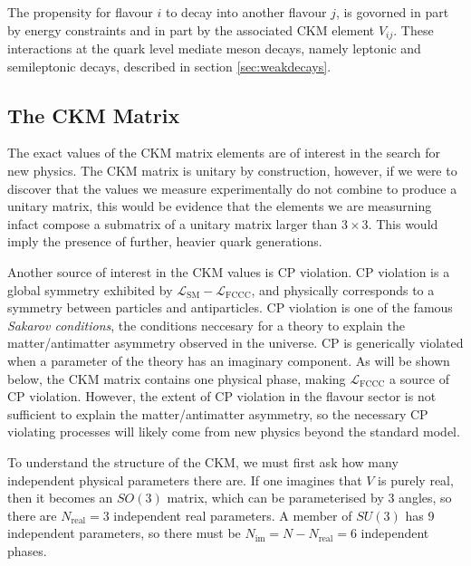 The propensity for flavour $i$ to decay into another flavour $j$, is govorned in part by energy constraints and in part by the associated CKM element $V_{ij}$. These interactions at the quark level mediate meson decays, namely leptonic and semileptonic decays, described in section \ref{sec:weakdecays}.

\subsection{The CKM Matrix}

The exact values of the CKM matrix elements are of interest in the search for new physics. The CKM matrix is unitary by construction, however, if we were to discover that the values we measure experimentally do not combine to produce a unitary matrix, this would be evidence that the elements we are measurning infact compose a submatrix of a unitary matrix larger than $3\times 3$. This would imply the presence of further, heavier quark generations.

Another source of interest in the CKM values is CP violation. CP violation is a global symmetry exhibited by $\mathcal{L}_{\text{SM}}-\mathcal{L}_{\text{FCCC}}$, and physically corresponds to a symmetry between particles and antiparticles. CP violation is one of the famous {\it{Sakarov conditions}}, the conditions neccesary for a theory to explain the matter/antimatter asymmetry observed in the universe. CP is generically violated when a parameter of the theory has an imaginary component. As will be shown below, the CKM matrix contains one physical phase, making $\mathcal{L}_{\text{FCCC}}$ a source of CP violation. However, the extent of CP violation in the flavour sector is not sufficient to explain the matter/antimatter asymmetry, so the necessary CP violating processes will likely come from new physics beyond the standard model.


To understand the structure of the CKM, we must first ask how many independent physical parameters there are. If one imagines that $V$ is purely real, then it becomes an $SO(3)$ matrix, which can be parameterised by 3 angles, so there are $N_{\text{real}} = 3$ independent real parameters. A member of $SU(3)$ has 9 independent parameters, so there must be $N_{\text{im}}=N-N_{\text{real}} = 6$ independent phases.


